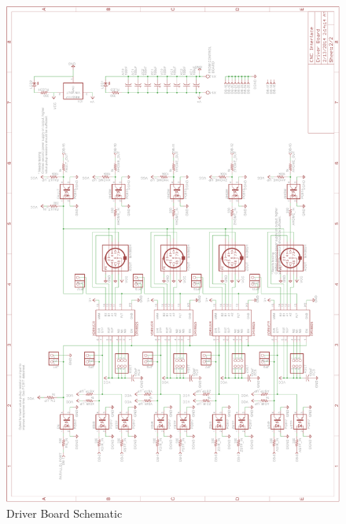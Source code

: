 \begin{figure}[h]
	\centering
	\includegraphics[width=.9\textwidth]{pcb-design/dschematic.png}
	\caption{Driver Board Schematic}
	\label{fig:driver-schematic}
\end{figure}